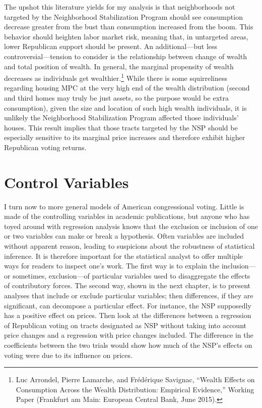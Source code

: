 \documentclass[12pt,oneside]{psthesis}
\begin{document}
The upshot this literature yields for my analysis is that neighborhoods not targeted by the Neighborhood Stabilization Program should see consumption decrease greater from the bust than consumption increased from the boom.
This behavior should heighten labor market risk, meaning that, in untargeted areas, lower Republican support should be present.
An additional---but less controversial---tension to consider is the relationship between change of wealth and total position of wealth.
In general, the marginal propensity of wealth decreases as individuals get wealthier.\footnote{Luc Arrondel, Pierre Lamarche, and Frédérique Savignac, ``Wealth Effects on Consumption Across the Wealth Distribution: Empirical Evidence,'' Working Paper (Frankfurt am Main: European Central Bank, June 2015).}
While there is some squirreliness regarding housing MPC at the very high end of the wealth distribution (second and third homes may truly be just assets, so the purpose would be extra consumption), given the size and location of such high wealth individuals, it is unlikely the Neighborhood Stabilization Program affected those individuals' houses.
This result implies that those tracts targeted by the NSP should be especially sensitive to its marginal price increases and therefore exhibit higher Republican voting returns.

\hypertarget{controls}{%
\section{Control Variables}\label{controls}}

I turn now to more general models of American congressional voting.
Little is made of the controlling variables in academic publications, but anyone who has toyed around with regression analysis knows that the exclusion or inclusion of one or two variables can make or break a hypothesis.
Often variables are included without apparent reason, leading to suspicions about the robustness of statistical inference.
It is therefore important for the statistical analyst to offer multiple ways for readers to inspect one's work.
The first way is to explain the inclusion---or sometimes, exclusion---of particular variables used to disaggregate the effects of contributory forces.
The second way, shown in the next chapter, is to present analyses that include or exclude particular variables; then differences, if they are significant, can decompose a particular effect.
For instance, the NSP supposedly has a positive effect on prices.
Then look at the differences between a regression of Republican voting on tracts designated as NSP without taking into account price changes and a regression with price changes included.
The difference in the coefficients between the two trials would show how much of the NSP's effects on voting were due to its influence on prices.
\end{document}
